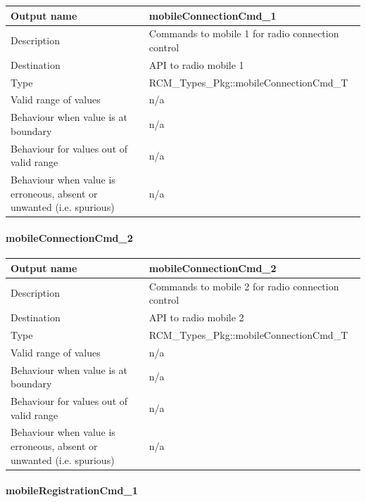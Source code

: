 \begin{longtable}{p{}p{}}
	\toprule
	Output name				& mobileConnectionCmd\_1 \\
	\midrule
	Description				& Commands to mobile 1 for radio connection control  \\
	\midrule
	Destination				& API to radio mobile 1 \\ 
	\midrule
	Type					& RCM\_Types\_Pkg::mobileConnectionCmd\_T \\
	\midrule
	Valid range of values	& n/a \\
	\midrule
	Behaviour when value is at boundary	& n/a \\
	\midrule
	Behaviour for values out of valid range	& n/a \\
	\midrule
	Behaviour when value is erroneous, absent or unwanted (i.e. spurious) & n/a \\
	\bottomrule
\end{longtable}

\paragraph{mobileConnectionCmd\_2}

\begin{longtable}{p{}p{}}
	\toprule
	Output name				& mobileConnectionCmd\_2 \\
	\midrule
	Description				& Commands to mobile 2 for radio connection control  \\
	\midrule
	Destination				& API to radio mobile 2 \\ 
	\midrule
	Type					& RCM\_Types\_Pkg::mobileConnectionCmd\_T \\
	\midrule
	Valid range of values	& n/a \\
	\midrule
	Behaviour when value is at boundary	& n/a \\
	\midrule
	Behaviour for values out of valid range	& n/a \\
	\midrule
	Behaviour when value is erroneous, absent or unwanted (i.e. spurious) & n/a \\
	\bottomrule
\end{longtable}

\paragraph{mobileRegistrationCmd\_1}

